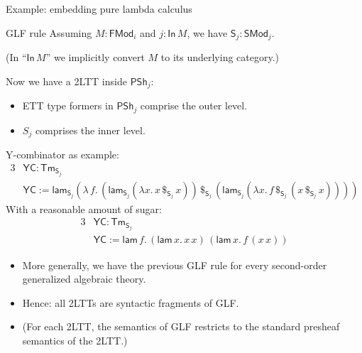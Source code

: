 \documentclass[dvipsnames,aspectratio=169]{beamer}
\newcommand{\ms}[1]{\mathsf{#1}}
\newcommand{\Tm}{\mathsf{Tm}}
\newcommand{\In}{\mathsf{In}}
\newcommand{\PSh}{\mathsf{PSh}}
\newcommand{\SMod}{\mathsf{SMod}}
\newcommand{\FMod}{\mathsf{FMod}}
\renewcommand{\S}{\mathsf{S}}
\newcommand{\lam}{\ms{lam}}
\begin{document}
\begin{frame}{Example: embedding pure lambda calculus}

\begin{block}{GLF rule}
  Assuming $M : \FMod_i$ and $j : \In\,M$, we have $\S_j : \SMod_j$.

  {\footnotesize (In ``$\In\,M$'' we implicitly convert $M$ to its underlying category.)}
\end{block}
\vspace{0.5em}
\pause

Now we have a 2LTT inside $\PSh_j$:
\begin{itemize}
\item ETT type formers in $\PSh_j$ comprise the outer level.
\item $S_j$ comprises the inner level.
\end{itemize}
\vspace{0.5em}
\pause
Y-combinator as example:
\begin{alignat*}{3}
  & \ms{YC} : \Tm_{\S_j} \\
  & \ms{YC} := \lam_{\S_j}(\lambda\,f.\,(\lam_{\S_j} (\lambda x.\, x\,\$_{\S_j}\,x))\,\$_{\S_j}\,
               (\lam_{\S_j} (\lambda x.\, f \,\$_{\S_j}\, (x \,\$_{\S_j}\, x))))
\end{alignat*}
\pause
With a reasonable amount of sugar:
\begin{alignat*}{3}
  & \ms{YC} : \Tm_{\S_j} \\
  & \ms{YC} := \lam\,f.\,(\lam\,x.\,x\,x)\,(\lam\,x.\,f\,(x\,x))
\end{alignat*}

\end{frame}

\begin{frame}{}

\begin{itemize}
\item More generally, we have the previous GLF rule for every second-order generalized algebraic theory.
\pause
\item Hence: all 2LTTs are syntactic fragments of GLF.
\pause
\item (For each 2LTT, the semantics of GLF restricts to the standard presheaf semantics of the 2LTT.)
\end{itemize}


\end{frame}
\end{document}
